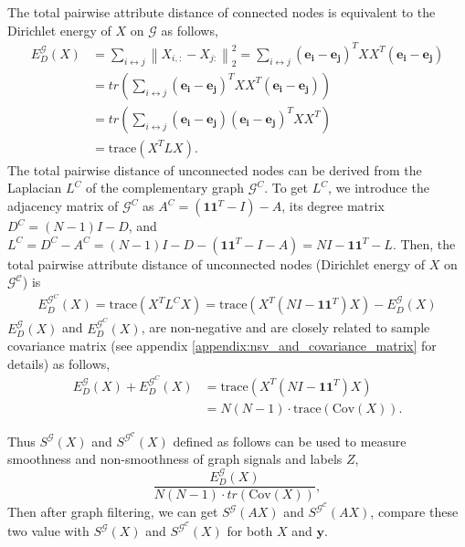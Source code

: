 \documentclass{article}
\newcommand{\norm}[1]{\left\lVert#1\right\rVert}
\newcommand{\trace}{\mathrm{trace}}
\newcommand{\0}{{\boldsymbol{0}}}
\newcommand{\6}{{\partial}}
\newcommand{\8}{{\infty}}
\newcommand{\4}{{\nabla}}
\providecommand{\norm}[1]{\lVert#1\rVert}
\begin{document}
The total pairwise attribute distance of connected nodes is equivalent to the Dirichlet energy of $X$ on $\mathcal{G}$ as follows,
\begin{align*}
    E_D^\mathcal{G}({X}) &= \sum\limits_{i \leftrightarrow j} \norm{X_{i,:} - X_{j:}}_2^2 = \sum\limits_{i \leftrightarrow j} (\bm{e_i}-\bm{e_j})^T {X} {X}^T (\bm{e_i}-\bm{e_j}) \\
    & = tr\left(\sum\limits_{i \leftrightarrow j} (\bm{e_i}-\bm{e_j})^T {X} {X}^T (\bm{e_i}-\bm{e_j}) \right) \\
    & = tr\left(\sum\limits_{i \leftrightarrow j} (\bm{e_i}-\bm{e_j}) (\bm{e_i}-\bm{e_j})^T {X} {X}^T \right) \\
    & = \trace({X}^T L {X}).
\end{align*}
The total pairwise distance of unconnected nodes can be derived from the Laplacian $L^{C}$ of the complementary graph $\mathcal{G}^C$. To get $L^C$, we introduce the adjacency matrix of $\mathcal{G}^C$  as $A^{C} = (\bm{1}\bm{1}^T-I) -A$, its degree matrix $D^{C} = (N-1)I-D$, and $L^{C} = D^{C} - A^{C} = (N-1)I-D - (\bm{1}\bm{1}^T-I -A) = NI - \bm{1}\bm{1}^T - L$. Then, the total pairwise attribute distance of unconnected nodes (Dirichlet energy of $X$ on $\mathcal{G^C}$) is 
\begin{align*}
E_D^{\mathcal{G}^C}({X})\!=\!\trace\left({X}^T L^C {X}\right)\!=\!\trace\left({X}^T (NI\!-\!\bm{1}\bm{1}^T ) {X}\right) - E_D^\mathcal{G}({X})
\end{align*}
$E_D^\mathcal{G}({X})$ and $E_D^{\mathcal{G}^C}({X})$, are non-negative and are closely related to sample covariance matrix (see appendix \ref{appendix:nsv_and_covariance_matrix} for details) as follows,
\begin{align*}
E_D^\mathcal{G}({X}) + E_D^{\mathcal{G}^C}({X}) &= \trace\left({X}^T (NI - \bm{1}\bm{1}^T ) {X}\right) \\
& = N(N-1) \cdot \trace \left(\text{Cov}(X)\right).
\end{align*}

Thus $S^\mathcal{G}(X)$ and $S^\mathcal{G^C}(X)$ defined as follows can be used to measure smoothness and non-smoothness of graph signals and labels $Z$,
\begin{equation}  
  \frac{E_D^\mathcal{G}({X})}{N(N-1) \cdot tr\left(\text{Cov}(X)\right)},\end{equation}
Then after graph filtering, we can get $S^\mathcal{G}(A{X})$ and $S^\mathcal{G^C}(A{X})$, compare these two value with $S^\mathcal{G}({X})$ and $S^\mathcal{G^C}({X})$ for both ${X}$ and $\bm{y}$.
\end{document}
